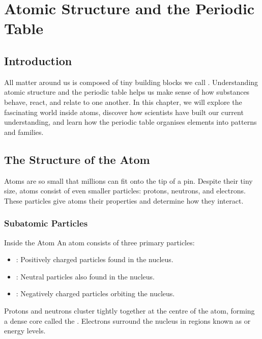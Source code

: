 \chapter{Atomic Structure and the Periodic Table}

\section{Introduction}
All matter around us is composed of tiny building blocks we call . Understanding atomic structure and the periodic table helps us make sense of how substances behave, react, and relate to one another. In this chapter, we will explore the fascinating world inside atoms, discover how scientists have built our current understanding, and learn how the periodic table organises elements into patterns and families.

\section{The Structure of the Atom}

Atoms are so small that millions can fit onto the tip of a pin. Despite their tiny size, atoms consist of even smaller particles: protons, neutrons, and electrons. These particles give atoms their properties and determine how they interact.

\subsection{Subatomic Particles}

\begin{keyconcept}{Inside the Atom}
An atom consists of three primary particles:
\begin{itemize}
	\item {}: Positively charged particles found in the nucleus.
	\item {}: Neutral particles also found in the nucleus.
	\item {}: Negatively charged particles orbiting the nucleus.
\end{itemize}
\end{keyconcept}

Protons and neutrons cluster tightly together at the centre of the atom, forming a dense core called the . Electrons surround the nucleus in regions known as  or energy levels.


